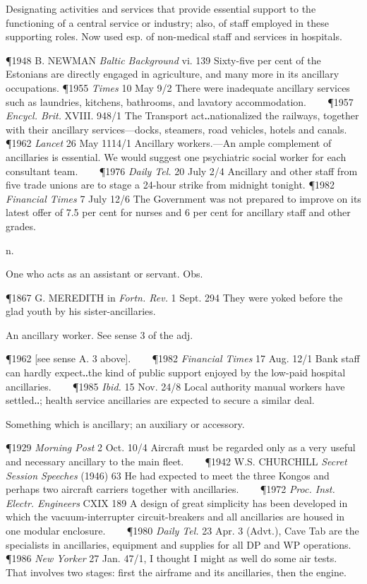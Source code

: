\begin{description}[wide, labelwidth=!, labelindent=0pt]
\begin{myenumerate}
 Designating activities and services that provide essential support to the
functioning of a central service or industry; also, of staff employed in these
supporting roles. Now used esp. of non-medical staff and services in hospitals. 

\P 1948 B. NEWMAN \textit{Baltic Background} vi. 139 Sixty-five per cent of the Estonians
are directly engaged in agriculture, and many more in its ancillary occupations.
\P 1955 \textit{Times} 10 May 9/2 There were inadequate ancillary services such as
laundries, kitchens, bathrooms, and lavatory accommodation.    
\P 1957 \textit{Encycl. Brit.} XVIII. 948/1 The Transport act‥nationalized the railways, together with
their ancillary services—docks, steamers, road vehicles, hotels and canals.
\P 1962 \textit{Lancet} 26 May 1114/1 Ancillary workers.—An ample complement of
ancillaries is essential. We would suggest one psychiatric social worker for
each consultant team.    
\P 1976 \textit{Daily Tel.} 20 July 2/4 Ancillary and other staff
from five trade unions are to stage a 24-hour strike from midnight tonight.
\P 1982 \textit{Financial Times} 7 July 12/6 The Government was not prepared to improve
on its latest offer of 7.5 per cent for nurses and 6 per cent for ancillary
staff and other grades.

 n. 

 One who acts as an assistant or servant. Obs.

\P 1867 G. MEREDITH in \textit{Fortn. Rev.} 1 Sept. 294 They were yoked before the glad
youth by his sister-ancillaries.

 An ancillary worker. See sense 3 of the adj. 

\P 1962 [see sense A. 3 above].    
\P 1982 \textit{Financial Times} 17 Aug. 12/1 Bank staff
can hardly expect‥the kind of public support enjoyed by the low-paid hospital
ancillaries.    
\P 1985 \textit{Ibid.} 15 Nov. 24/8 Local authority manual workers have
settled‥; health service ancillaries are expected to secure a similar deal.

 Something which is ancillary; an auxiliary or accessory. 

\P 1929 \textit{Morning Post} 2 Oct. 10/4 Aircraft must be regarded only as a very useful
and necessary ancillary to the main fleet.    
\P 1942 W.S. CHURCHILL \textit{Secret Session Speeches} 
(1946) 63 He had expected to meet the three Kongos and perhaps
two aircraft carriers together with ancillaries.    
\P 1972 \textit{Proc. Inst. Electr. Engineers} CXIX 189 A design of great 
simplicity has been developed in which the
vacuum-interrupter circuit-breakers and all ancillaries are housed in one
modular enclosure.    
\P 1980 \textit{Daily Tel.} 23 Apr. 3 (Advt.), Cave Tab are the
specialists in ancillaries, equipment and supplies for all DP and WP operations.
\P 1986 \textit{New Yorker} 27 Jan. 47/1, I thought I might as well do some air tests.
That involves two stages: first the airframe and its ancillaries, then the
engine.
\end{myenumerate}


\end{description}
